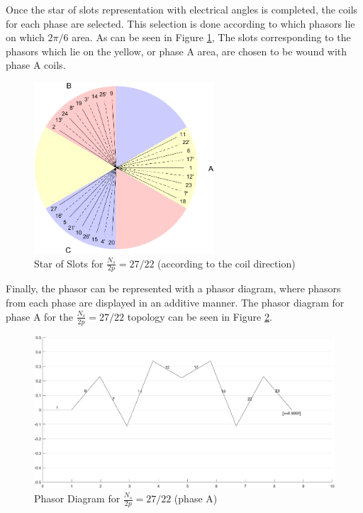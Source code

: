 \documentclass[a4paper, 11pt]{article}
\begin{document}
Once the star of slots representation with electrical angles is completed, the coils for each phase are selected. This selection is done according to which phasors lie on which $2\pi/6$ area. As can be seen in Figure \ref{fig:sos_2722_wSectors}, The slots corresponding to the phasors which lie on the yellow, or phase A area, are chosen to be wound with phase A coils.



\begin{figure}[h!]
    \centering
	\begin{center}
		\includegraphics[width=0.6\textwidth]{Q2_2722_phasorDiagram_wSectors.png}
	\end{center}
	\caption{Star of Slots for $\frac{N_s}{2p}=27/22$ (according to the coil direction)}
	\label{fig:sos_2722_wSectors}
\end{figure}

Finally, the phasor can be represented with a phasor diagram, where phasors from each phase are displayed in an additive manner. The phasor diagram for phase A for the $\frac{N_s}{2p}=27/22$ topology can be seen in Figure \ref{fig:phasor_d_2722}.


\begin{figure}[h!]
    \centering
	\begin{center}
		\includegraphics[width=1.0\textwidth]{Q2_2722_phasorDiagram_1ph.png}
	\end{center}
	\caption{Phasor Diagram for $\frac{N_s}{2p}=27/22$ (phase A)}
	\label{fig:phasor_d_2722}
\end{figure}
\end{document}
